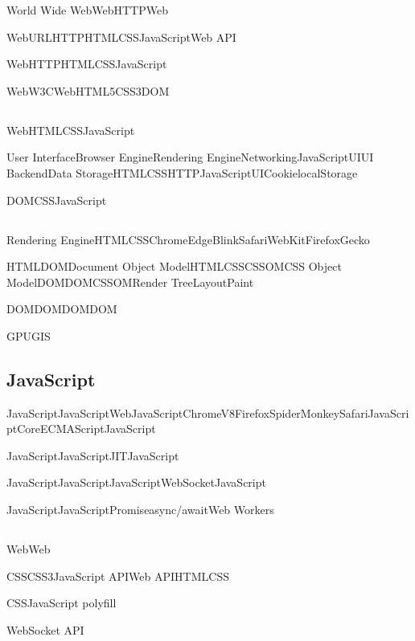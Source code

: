 World Wide WebWebHTTPWeb

WebURLHTTPHTMLCSSJavaScriptWeb API

WebHTTPHTMLCSSJavaScript

\important{} WebW3CWebHTML5CSS3DOM

\hypertarget{section-10}{%
\subsection{}\label{section-10}}

WebHTMLCSSJavaScript

User InterfaceBrowser EngineRendering EngineNetworkingJavaScriptUIUI
BackendData StorageHTMLCSSHTTPJavaScriptUICookielocalStorage

DOMCSSJavaScript

\hypertarget{section-11}{%
\subsection{}\label{section-11}}

Rendering EngineHTMLCSSChromeEdgeBlinkSafariWebKitFirefoxGecko

HTMLDOMDocument Object ModelHTMLCSSCSSOMCSS Object
ModelDOMDOMCSSOMRender TreeLayoutPaint

DOMDOMDOMDOM

\important{} GPUGIS

\hypertarget{javascript}{%
\subsection{JavaScript}\label{javascript}}

JavaScriptJavaScriptWebJavaScriptChromeV8FirefoxSpiderMonkeySafariJavaScriptCoreECMAScriptJavaScript

JavaScriptJavaScriptJITJavaScript

JavaScriptJavaScriptJavaScriptWebSocketJavaScript

JavaScriptJavaScriptPromiseasync/awaitWeb Workers

\hypertarget{section-12}{%
\subsection{}\label{section-12}}

WebWeb

CSSCSS3JavaScript APIWeb APIHTMLCSS

CSSJavaScript polyfill

\important{} WebSocket API

